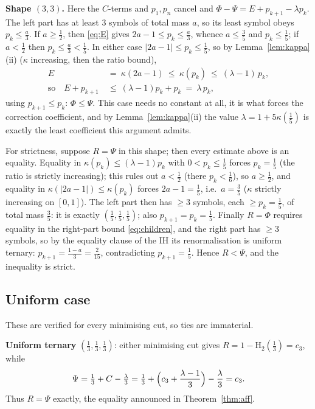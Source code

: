 \documentclass[journal]{IEEEtran}
\theoremstyle{definition}
\newcommand{\Hh}{\mathrm H_2}
\newcommand{\kp}{\kappa}
\newcommand{\CC}{C}
\newcommand{\lam}{\lambda}
\newcommand{\cthree}{c_3}
\begin{document}
\medskip\noindent\textbf{Shape $(3,3)$.}
Here the $\CC$-terms and $p_1,p_n$ cancel and
$\Phi-\Psi=E+p_{k+1}-\lam p_k$. The left part has at least $3$ symbols of
total mass $a$, so its least symbol obeys $p_k\le\tfrac a3$. If $a\ge\tfrac12$,
then \eqref{eq:E} gives $2a-1\le p_k\le\tfrac a3$, whence $a\le\tfrac35$ and
$p_k\le\tfrac15$; if $a<\tfrac12$ then $p_k\le\tfrac a3<\tfrac15$. In
either case $|2a-1|\le p_k\le\tfrac15$, so by Lemma~\ref{lem:kappa}(ii)
($\kp$ increasing, then the ratio bound),
\[
\begin{aligned}
  E\ &=\ \kp(2a-1)\ \le\ \kp(p_k)\ \le\ (\lam-1)\,p_k ,\\
  \text{so}\quad
  E+p_{k+1}\ &\le\ (\lam-1)p_k+p_k\ =\ \lam\,p_k ,
\end{aligned}
\]
using $p_{k+1}\le p_k$: $\Phi\le\Psi$. This case needs no constant at all,
it is what forces the correction coefficient, and by
Lemma~\ref{lem:kappa}(ii) the value $\lam=1+5\kp(\tfrac15)$ is exactly the
least coefficient this argument admits.

For strictness, suppose $R=\Psi$ in this shape; then every estimate above
is an equality. Equality in $\kp(p_k)\le(\lam-1)p_k$ with $0<p_k\le\tfrac15$
forces $p_k=\tfrac15$ (the ratio is strictly increasing); this rules
out $a<\tfrac12$ (there $p_k<\tfrac16$), so $a\ge\tfrac12$, and equality in
$\kp(|2a-1|)\le\kp(p_k)$ forces $2a-1=\tfrac15$, i.e.\ $a=\tfrac35$ ($\kp$
strictly increasing on $[0,1]$). The left part then has $\ge3$ symbols, each
$\ge p_k=\tfrac15$, of total mass $\tfrac35$: it is exactly
$(\tfrac15,\tfrac15,\tfrac15)$; also $p_{k+1}=p_k=\tfrac15$. Finally $R=\Phi$
requires equality in the right-part bound \eqref{eq:children}, and the right
part has $\ge3$ symbols, so by the equality clause of the IH its
renormalisation is uniform ternary: $p_{k+1}=\tfrac{1-a}3=\tfrac2{15}$,
contradicting $p_{k+1}=\tfrac15$. Hence $R<\Psi$, and the inequality is strict.

\subsection{Uniform case}\label{ss:unif}

These are verified for every minimising cut, so ties are immaterial.

\textbf{Uniform ternary} $(\tfrac13,\tfrac13,\tfrac13)$: either minimising cut
gives $R=1-\Hh(\tfrac13)=\cthree$, while
\[
  \Psi=\tfrac13+\CC-\tfrac{\lam}3
      =\tfrac13+\Bigl(\cthree+\frac{\lam-1}{3}\Bigr)-\frac{\lam}{3}
      =\cthree .
\]
Thus $R=\Psi$ exactly, the equality announced in Theorem~\ref{thm:aff}.
\end{document}
